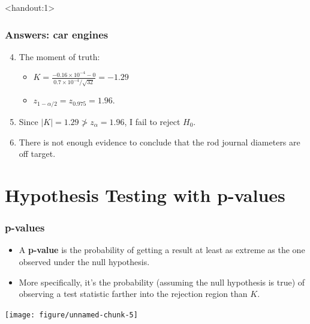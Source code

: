 \documentclass[handout]{beamer}\usepackage{graphicx, color}
\newenvironment{knitrout}{}{} %
\newcommand{\answers}{1}
\numberwithin{equation}{section}
\begin{document}
\begin{frame}<handout:\answers>
\frametitle{Answers: car engines}
\begin{enumerate}
\setcounter{enumi}{3}
\item The moment of truth:
\begin{itemize}
\pause \item $K = \frac{-0.16 \times 10^{-4} - 0}{0.7 \times 10^{-4}/\sqrt{32}} = -1.29 $
\pause \item $z_{1-\alpha/2} = z_{0.975} = 1.96$.
\end{itemize}
\pause \item Since $|K| = 1.29 \not > z_\alpha = 1.96$, I fail to reject $H_0$.
\pause \item There is not enough evidence to conclude that the rod journal diameters are off target.
\end{enumerate}
\end{frame}







\section{Hypothesis Testing with p-values}


\begin{frame}[fragile]
\frametitle{p-values}
\begin{itemize}
\item A {\bf p-value} is the probability of getting a result at least as extreme as the one observed under the null hypothesis.
\pause \item More specifically, it's the probability (assuming the null hypothesis is true) of observing a test statistic farther into the rejection region than $K$.
\end{itemize}

\pause \begin{center}

\begin{knitrout}
\color{fgcolor}
\texttt{[image: figure/unnamed-chunk-5]} 

\end{knitrout}

\end{center}
\end{frame}
\end{document}
